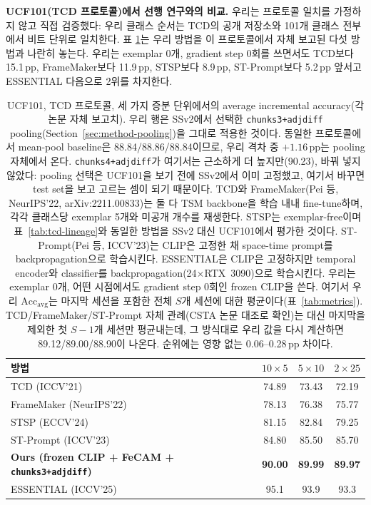 \documentclass[11pt]{article}
\begin{document}
\textbf{UCF101(TCD 프로토콜)에서 선행 연구와의 비교.} 우리는 프로토콜
일치를 가정하지 않고 직접 검증했다: 우리 클래스 순서는 TCD의 공개
저장소와 101개 클래스 전부에서 비트 단위로 일치한다. 표
\ref{tab:ucf101-compare}는 우리 방법을 이 프로토콜에서 자체 보고된
다섯 방법과 나란히 놓는다. 우리는 exemplar 0개, gradient step 0회를
쓰면서도 TCD보다 15.1\,pp, FrameMaker보다 11.9\,pp, STSP보다 8.9\,pp,
ST-Prompt보다 5.2\,pp 앞서고 ESSENTIAL 다음으로 2위를 차지한다.

\begin{table}[h]
\centering
\caption{UCF101, TCD 프로토콜, 세 가지 증분 단위에서의 average
incremental accuracy(각 논문 자체 보고치). 우리 행은 SSv2에서 선택한
\texttt{chunks3+adjdiff} pooling(Section~\ref{sec:method-pooling})을
그대로 적용한 것이다. 동일한 프로토콜에서 mean-pool baseline은
88.84/88.86/88.84이므로, 우리 격차 중 $+1.16$\,pp는 pooling 자체에서
온다. \texttt{chunks4+adjdiff}가 여기서는 근소하게 더 높지만(90.23),
바꿔 넣지 않았다: pooling 선택은 UCF101을 보기 전에 SSv2에서 이미
고정했고, 여기서 바꾸면 test set을 보고 고르는 셈이 되기 때문이다.
TCD와 FrameMaker(Pei 등,
NeurIPS'22, arXiv:2211.00833)는 둘 다 TSM backbone을 학습 내내
fine-tune하며, 각각 클래스당 exemplar 5개와 미공개 개수를 재생한다.
STSP는 exemplar-free이며 표~\ref{tab:tcd-lineage}와 동일한 방법을
SSv2 대신 UCF101에서 평가한 것이다. ST-Prompt(Pei 등, ICCV'23)는 CLIP은
고정한 채 space-time prompt를 backpropagation으로 학습시킨다.
ESSENTIAL은 CLIP은 고정하지만 temporal encoder와 classifier를
backpropagation(24$\times$RTX~3090)으로 학습시킨다. 우리는 exemplar
0개, 어떤 시점에서도 gradient step 0회인 frozen CLIP을 쓴다. 여기서 우리
$\mathrm{Acc}_{\mathrm{avg}}$는 마지막 세션을 포함한 전체 $S$개 세션에
대한 평균이다(표~\ref{tab:metrics}). TCD/FrameMaker/ST-Prompt 자체
관례(CSTA 논문 대조로 확인)는 대신 마지막을 제외한 첫 $S{-}1$개 세션만
평균내는데, 그 방식대로 우리 값을 다시 계산하면 89.12/89.00/88.90이
나온다. 순위에는 영향 없는 0.06--0.28\,pp 차이다.}
\label{tab:ucf101-compare}
\small
\begin{tabular}{@{}lccc@{}}
\toprule
방법 & $10\times5$ & $5\times10$ & $2\times25$ \\
\midrule
TCD (ICCV'21) & 74.89 & 73.43 & 72.19 \\
FrameMaker (NeurIPS'22) & 78.13 & 76.38 & 75.77 \\
STSP (ECCV'24) & 81.15 & 82.84 & 79.25 \\
ST-Prompt (ICCV'23) & 84.80 & 85.50 & 85.70 \\
\textbf{Ours (frozen CLIP + FeCAM + \texttt{chunks3+adjdiff})} & \textbf{90.00} & \textbf{89.99} & \textbf{89.97} \\
ESSENTIAL (ICCV'25) & 95.1 & 93.9 & 93.3 \\
\bottomrule
\end{tabular}
\end{table}
\end{document}
